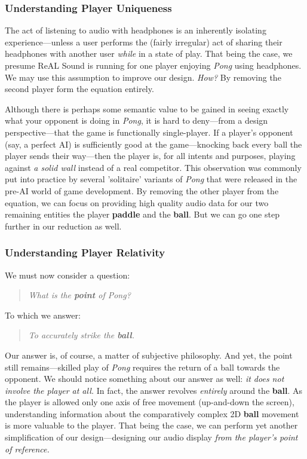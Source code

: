 \documentclass{report}
\newcommand{\rs}{ReAL Sound\xspace}
\newcommand{\pad}{\textbf{paddle}\xspace}
\newcommand{\ball}{\textbf{ball}\xspace}
\begin{document}
\subsubsection{Understanding Player Uniqueness}
The act of listening to audio with headphones is an inherently isolating experience---unless a user performs the (fairly irregular) act of sharing their headphones with another user \emph{while} in a state of play. That being the case, we presume \rs is running for one player enjoying \emph{Pong} using headphones. We may use this assumption to improve our design. \emph{How?} By removing the second player form the equation entirely. 

Although there is perhaps some semantic value to be gained in seeing exactly what your opponent is doing in \emph{Pong}, it is hard to deny---from a design perspective---that the game is functionally single-player. If a player's opponent (say, a perfect AI) is sufficiently good at the game---knocking back every ball the player sends their way---then the player is, for all intents and purposes, playing against \emph{a solid wall} instead of a real competitor. This observation was commonly put into practice by several 'solitaire' variants of \emph{Pong} that were released in the pre-AI world of game development. By removing the other player from the equation, we can focus on providing high quality audio data for our two remaining entities the player \pad and the \ball. But we can go one step further in our reduction as well. 


\subsubsection{Understanding Player Relativity}
We must now consider a question: 
\begin{quote}
\emph{What is the \textbf{point} of Pong?}     
\end{quote}

To which we answer:
\begin{quote}
\emph{To accurately strike the \ball.}
\end{quote}

Our answer is, of course, a matter of subjective philosophy. And yet, the point still remains---skilled play of \emph{Pong} requires the return of a ball towards the opponent. We should notice something about our answer as well: \emph{it does not involve the player at all.} In fact, the answer revolves \emph{entirely} around the \ball. As the player is allowed only one axis of free movement (up-and-down the screen), understanding information about the comparatively complex 2D \ball movement is more valuable to the player. That being the case, we can perform yet another simplification of our design---designing our audio display \emph{from the player's point of reference.} 
\end{document}
